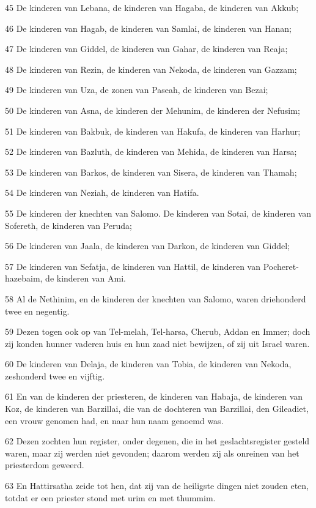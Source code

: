 \par 45 De kinderen van Lebana, de kinderen van Hagaba, de kinderen van Akkub;
\par 46 De kinderen van Hagab, de kinderen van Samlai, de kinderen van Hanan;
\par 47 De kinderen van Giddel, de kinderen van Gahar, de kinderen van Reaja;
\par 48 De kinderen van Rezin, de kinderen van Nekoda, de kinderen van Gazzam;
\par 49 De kinderen van Uza, de zonen van Paseah, de kinderen van Bezai;
\par 50 De kinderen van Asna, de kinderen der Mehunim, de kinderen der Nefusim;
\par 51 De kinderen van Bakbuk, de kinderen van Hakufa, de kinderen van Harhur;
\par 52 De kinderen van Bazluth, de kinderen van Mehida, de kinderen van Harsa;
\par 53 De kinderen van Barkos, de kinderen van Sisera, de kinderen van Thamah;
\par 54 De kinderen van Neziah, de kinderen van Hatifa.
\par 55 De kinderen der knechten van Salomo. De kinderen van Sotai, de kinderen van Sofereth, de kinderen van Peruda;
\par 56 De kinderen van Jaala, de kinderen van Darkon, de kinderen van Giddel;
\par 57 De kinderen van Sefatja, de kinderen van Hattil, de kinderen van Pocheret-hazebaim, de kinderen van Ami.
\par 58 Al de Nethinim, en de kinderen der knechten van Salomo, waren driehonderd twee en negentig.
\par 59 Dezen togen ook op van Tel-melah, Tel-harsa, Cherub, Addan en Immer; doch zij konden hunner vaderen huis en hun zaad niet bewijzen, of zij uit Israel waren.
\par 60 De kinderen van Delaja, de kinderen van Tobia, de kinderen van Nekoda, zeshonderd twee en vijftig.
\par 61 En van de kinderen der priesteren, de kinderen van Habaja, de kinderen van Koz, de kinderen van Barzillai, die van de dochteren van Barzillai, den Gileadiet, een vrouw genomen had, en naar hun naam genoemd was.
\par 62 Dezen zochten hun register, onder degenen, die in het geslachtsregister gesteld waren, maar zij werden niet gevonden; daarom werden zij als onreinen van het priesterdom geweerd.
\par 63 En Hattirsatha zeide tot hen, dat zij van de heiligste dingen niet zouden eten, totdat er een priester stond met urim en met thummim.
